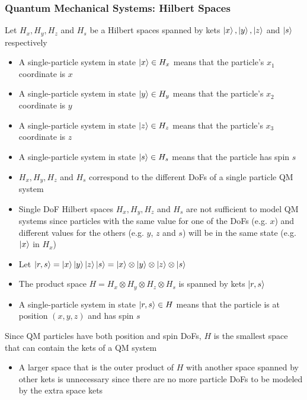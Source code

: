 \documentclass[8pt,t,mathserif,aspectratio=169]{beamer}
\begin{document}
\begin{frame}
  \frametitle{Quantum Mechanical Systems: Hilbert Spaces}
  \vspace{1mm}
  Let $H_x,H_y,H_z$ and $H_s$ be a Hilbert spaces spanned by kets $\ket{x},\ket{y},\ket{z}$ and $\ket{s}$ respectively
  \begin{itemize}
    \item A single-particle system in state $\ket{x} \in H_x$ means that the particle's $x_1$ coordinate is $x$
    \item A single-particle system in state $\ket{y} \in H_y$ means that the particle's $x_2$ coordinate is $y$
    \item A single-particle system in state $\ket{z} \in H_z$ means that the particle's $x_3$ coordinate is $z$
    \item A single-particle system in state $\ket{s} \in H_s$ means that the particle has spin $s$
    \item $H_x, H_y, H_z$ and $H_s$ correspond to the different DoFs of a single particle QM system
    \item Single DoF Hilbert spaces $H_x,H_y,H_z$ and $H_s$ are not sufficient to model QM systems since particles with the same value for one of the DoFs (e.g. $x$) and different values for the others (e.g. $y$, $z$ and $s$) will be in the same state (e.g. $\ket{x}$ in $H_x$)
    \item Let $\ket{r,s} = \ket{x} \ket{y} \ket{z} \ket{s} = \ket{x} \otimes \ket{y} \otimes \ket{z} \otimes \ket{s}$
    \item The product space $H = H_x \otimes H_y \otimes H_z \otimes H_s$ is spanned by kets $\ket{r,s}$
    \item A single-particle system in state $\ket{r,s} \in H$ means that the particle is at position $(x,y,z)$ and has spin $s$
  \end{itemize}
  Since QM particles have both position and spin DoFs, $H$ is the smallest space that can contain the kets of a QM system
  \begin{itemize}
    \item A larger space that is the outer product of $H$ with another space spanned by other kets is unnecessary since there are no more particle DoFs to be modeled by the extra space kets
  \end{itemize}
\end{frame}
\end{document}
